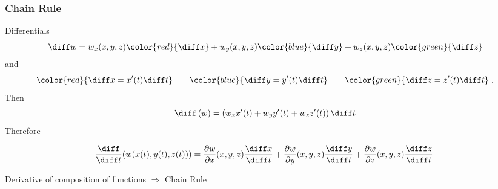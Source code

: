 \begin{frame}
  \frametitle{Chain Rule}
Differentials
%
\[
\diff w=w_x(x,y,z){\color{red}{\diff x}} +
w_y(x,y,z){\color{blue}{\diff y}}+
w_z(x,y,z){\color{green}{\diff z}}
\]
%
and
%
\[
{\color{red}{\diff x=x'(t)\diff t}} \qquad
{\color{blue}{\diff y = y'(t)\diff t}} \qquad
{\color{green}{\diff z=z'(t)\diff t}} \; .
\]
%
\pause Then
%
\[
\diff \left(w \right)= \left( w_x x'(t) + w_y y'(t) +
w_z z'(t) \right) \diff t
\]
%
\pause
Therefore

\[\!\!\displaystyle
\frac{\diff }{\diff t}(w(x(t), y(t), z(t))) = \frac{\partial w}{\partial x}(x,y,z) \frac{\diff x}{\diff t} +
\frac{\partial w}{\partial y}(x,y,z) \frac{\diff y}{\diff t} +
\frac{\partial w}{\partial z}(x,y,z) \frac{\diff z}{\diff t}
\]

\pause
Derivative of composition of functions $\Longrightarrow$ \alert<1->{Chain Rule}
\end{frame}
